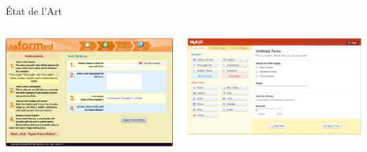 \documentclass[11pt]{beamer}
\begin{document}
\begin{frame}{État de l'Art}
\begin{columns}[t]
	\begin{column}[T]{.5\textwidth}
		\includegraphics[width=.47\paperwidth]{images/reformed.png}
  	\end{column}
  	\begin{column}[T]{.5\textwidth}
  		\includegraphics[width=.47\paperwidth]{images/WUFOO.png}
	\end{column}
\end{columns}

\end{frame}
\end{document}
